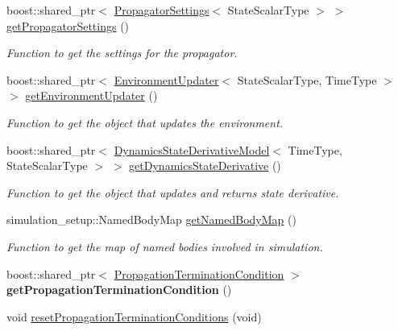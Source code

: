 \begin{DoxyCompactItemize}
boost\+::shared\+\_\+ptr$<$ \hyperlink{classtudat_1_1propagators_1_1PropagatorSettings}{Propagator\+Settings}$<$ State\+Scalar\+Type $>$ $>$ \hyperlink{classtudat_1_1propagators_1_1DynamicsSimulator_aa67bed5c537de9f5343d07ad5f8e28a9}{get\+Propagator\+Settings} ()
\begin{DoxyCompactList}\small\item\em Function to get the settings for the propagator. \end{DoxyCompactList}\item 
boost\+::shared\+\_\+ptr$<$ \hyperlink{classtudat_1_1propagators_1_1EnvironmentUpdater}{Environment\+Updater}$<$ State\+Scalar\+Type, Time\+Type $>$ $>$ \hyperlink{classtudat_1_1propagators_1_1DynamicsSimulator_a5f0da6c4af850454e25dd3f8d52062bb}{get\+Environment\+Updater} ()
\begin{DoxyCompactList}\small\item\em Function to get the object that updates the environment. \end{DoxyCompactList}\item 
boost\+::shared\+\_\+ptr$<$ \hyperlink{classtudat_1_1propagators_1_1DynamicsStateDerivativeModel}{Dynamics\+State\+Derivative\+Model}$<$ Time\+Type, State\+Scalar\+Type $>$ $>$ \hyperlink{classtudat_1_1propagators_1_1DynamicsSimulator_a23e27a938f85d24385e737eb117faca0}{get\+Dynamics\+State\+Derivative} ()
\begin{DoxyCompactList}\small\item\em Function to get the object that updates and returns state derivative. \end{DoxyCompactList}\item 
simulation\+\_\+setup\+::\+Named\+Body\+Map \hyperlink{classtudat_1_1propagators_1_1DynamicsSimulator_ad7787475f86f5bfd27382ac7da2696b6}{get\+Named\+Body\+Map} ()
\begin{DoxyCompactList}\small\item\em Function to get the map of named bodies involved in simulation. \end{DoxyCompactList}\item 
boost\+::shared\+\_\+ptr$<$ \hyperlink{classtudat_1_1propagators_1_1PropagationTerminationCondition}{Propagation\+Termination\+Condition} $>$ {\bfseries get\+Propagation\+Termination\+Condition} ()\hypertarget{classtudat_1_1propagators_1_1DynamicsSimulator_a250a7c2a5d338aace3ad7006549db2a5}{}\label{classtudat_1_1propagators_1_1DynamicsSimulator_a250a7c2a5d338aace3ad7006549db2a5}

\item 
void \hyperlink{classtudat_1_1propagators_1_1DynamicsSimulator_aa32504872b8b83fa0fd69b83f35efb77}{reset\+Propagation\+Termination\+Conditions} (void)
\end{DoxyCompactItemize}
